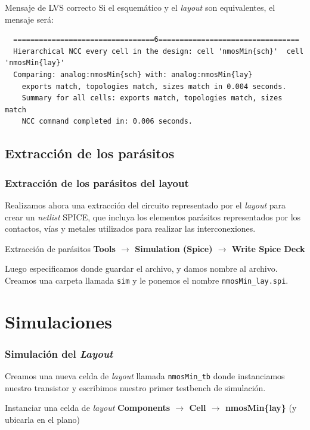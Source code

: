 \documentclass{beamer}
\begin{document}
\begin{frame}[fragile]{Mensaje de LVS correcto}
  Si el esquemático y el \emph{layout} son equivalentes, el mensaje será:
  \begin{tiny}
  \begin{verbatim}
  =================================6=================================
  Hierarchical NCC every cell in the design: cell 'nmosMin{sch}'  cell 'nmosMin{lay}'
  Comparing: analog:nmosMin{sch} with: analog:nmosMin{lay}
    exports match, topologies match, sizes match in 0.004 seconds.
    Summary for all cells: exports match, topologies match, sizes match
    NCC command completed in: 0.006 seconds.
  \end{verbatim}
\end{tiny}
\end{frame}
\subsection{Extracción de los parásitos}
\begin{frame}[fragile]
\frametitle{Extracción de los parásitos del layout}
Realizamos ahora una extracción del circuito representado por el \emph{layout} para crear un \emph{netlist} SPICE, que incluya los elementos parásitos representados por los contactos, vías y metales utilizados para realizar las interconexiones.

\begin{exampleblock}{Extracción de parásitos}
\textbf{
Tools $\rightarrow$ Simulation (Spice) $\rightarrow$ Write Spice Deck
}
\end{exampleblock}


Luego especificamos donde guardar el archivo, y damos nombre al archivo. Creamos una carpeta llamada \verb.sim. y le ponemos el nombre \verb(nmosMin_lay.spi(.

\end{frame}
\section{Simulaciones}
\begin{frame}[fragile]
  \frametitle{Simulación del \emph{Layout}}
  Creamos una nueva celda de \emph{layout} llamada \verb.nmosMin_tb. donde instanciamos nuestro transistor y escribimos nuestro primer testbench de simulación.
  \begin{exampleblock}{Instanciar una celda de \emph{layout}}
\textbf{
Components $\rightarrow$ Cell $\rightarrow$ nmosMin\{lay\}} (y ubicarla en el plano)

  \end{exampleblock}
\end{frame}
\end{document}
